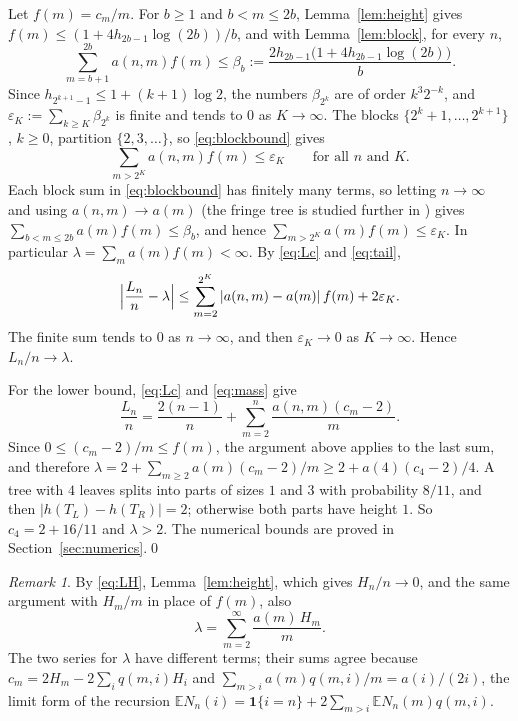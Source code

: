 \documentclass[11pt]{amsart}
\theoremstyle{remark}
\newtheorem{remark}[theorem]{Remark}
\numberwithin{equation}{section}
\newcommand{\E}{\mathbb E}
\begin{document}
Let $f(m)=c_m/m$. For $b\ge1$ and $b<m\le2b$, Lemma~\ref{lem:height} gives $f(m)\le(1+4h_{2b-1}\log(2b))/b$, and with Lemma~\ref{lem:block}, for every $n$,
\begin{equation}\label{eq:blockbound}
 \sum_{m=b+1}^{2b}a(n,m)f(m)\le\beta_b:=\frac{2h_{2b-1}\bigl(1+4h_{2b-1}\log(2b)\bigr)}{b}.
\end{equation}
Since $h_{2^{k+1}-1}\le1+(k+1)\log2$, the numbers $\beta_{2^k}$ are of order $k^3 2^{-k}$, and $\varepsilon_K:=\sum_{k\ge K}\beta_{2^k}$ is finite and tends to $0$ as $K\to\infty$. The blocks $\{2^k+1,\dots,2^{k+1}\}$, $k\ge0$, partition $\{2,3,\dots\}$, so \eqref{eq:blockbound} gives
\begin{equation}\label{eq:tail}
 \sum_{m>2^K}a(n,m)f(m)\le\varepsilon_K\qquad\text{for all }n\text{ and }K.
\end{equation}
Each block sum in \eqref{eq:blockbound} has finitely many terms, so letting $n\to\infty$ and using $a(n,m)\to a(m)$ \cite[Theorem 18]{AJ23} (the fringe tree is studied further in \cite{AJ24}) gives $\sum_{b<m\le2b}a(m)f(m)\le\beta_b$, and hence $\sum_{m>2^K}a(m)f(m)\le\varepsilon_K$. In particular $\lambda=\sum_ma(m)f(m)<\infty$. By \eqref{eq:Lc} and \eqref{eq:tail},
\[
 \Bigl|\frac{L_n}n-\lambda\Bigr|\le\sum_{m=2}^{2^K}|a(n,m)-a(m)|\,f(m)+2\varepsilon_K.
\]
The finite sum tends to $0$ as $n\to\infty$, and then $\varepsilon_K\to0$ as $K\to\infty$. Hence $L_n/n\to\lambda$.

For the lower bound, \eqref{eq:Lc} and \eqref{eq:mass} give
\[
 \frac{L_n}n=\frac{2(n-1)}n+\sum_{m=2}^n\frac{a(n,m)(c_m-2)}m.
\]
Since $0\le(c_m-2)/m\le f(m)$, the argument above applies to the last sum, and therefore $\lambda=2+\sum_{m\ge2}a(m)(c_m-2)/m\ge2+a(4)(c_4-2)/4$. A tree with $4$ leaves splits into parts of sizes $1$ and $3$ with probability $8/11$, and then $|h(T_L)-h(T_R)|=2$; otherwise both parts have height $1$. So $c_4=2+16/11$ and $\lambda>2$. The numerical bounds are proved in Section~\ref{sec:numerics}.\qed

\begin{remark}\label{rem:H}
By \eqref{eq:LH}, Lemma~\ref{lem:height}, which gives $H_n/n\to0$, and the same argument with $H_m/m$ in place of $f(m)$, also
\[
 \lambda=\sum_{m=2}^\infty\frac{a(m)\,H_m}{m}.
\]
The two series for $\lambda$ have different terms; their sums agree because $c_m=2H_m-2\sum_iq(m,i)H_i$ and $\sum_{m>i}a(m)q(m,i)/m=a(i)/(2i)$, the limit form of the recursion $\E N_n(i)=\mathbf 1\{i=n\}+2\sum_{m>i}\E N_n(m)q(m,i)$.
\end{remark}
\end{document}
